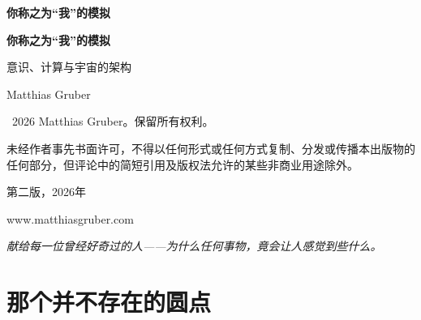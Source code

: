 \documentclass[11pt, twoside, openright]{book}
\makeatletter
\def\cleardoublepage{\clearpage\if@twoside \ifodd\c@page\else
  \thispagestyle{empty}\hbox{}\newpage
  \if@twocolumn\hbox{}\newpage\fi\fi\fi}
\makeatother
\begin{document}
\frontmatter
\pagestyle{empty}

\vspace*{3in}
\begin{center}
{\Huge\bfseries 你称之为“我”的模拟\par}
\end{center}
\cleardoublepage

\vspace*{2in}
\begin{center}
{\Huge\bfseries 你称之为“我”的模拟\par}
\vspace{0.8cm}
{\Large 意识、计算与宇宙的架构\par}
\vspace{2cm}
{\large Matthias Gruber\par}
\end{center}
\clearpage

\thispagestyle{empty}
\vspace*{\fill}
{\small
\noindent \textcopyright\ 2026 Matthias Gruber。保留所有权利。\par
\vspace{0.5cm}
\noindent 未经作者事先书面许可，不得以任何形式或任何方式复制、分发或传播本出版物的
任何部分，但评论中的简短引用及版权法允许的某些非商业用途除外。\par
\vspace{0.5cm}

\vspace{0.5cm}
\noindent 第二版，2026年\par
\vspace{0.5cm}
\noindent www.matthiasgruber.com\par
}
\cleardoublepage

\thispagestyle{empty}
\vspace*{3in}
\begin{center}
\textit{献给每一位曾经好奇过的人——为什么任何事物，竟会让人感觉到些什么。}
\end{center}
\cleardoublepage

\pagestyle{plain}
\renewcommand{\contentsname}{目录}
\renewcommand{\figurename}{图}
\tableofcontents
\cleardoublepage








\chapter*{那个并不存在的圆点}
\end{document}
